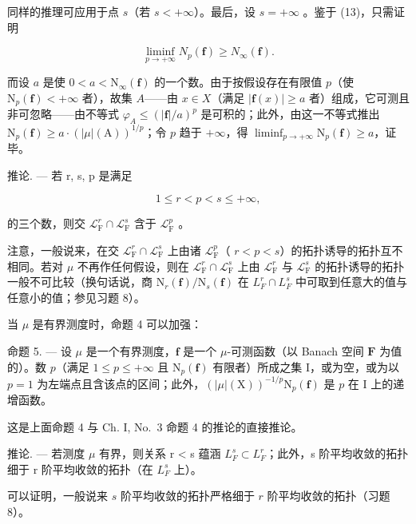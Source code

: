 同样的推理可应用于点 \(s\)（若 \(s < +\infty\)）。最后，设 \(s = +\infty\) 。鉴于 (13)，只需证明

\[
\liminf _ {p \to + \infty} N _ {p} (\mathbf {f}) \geqslant N _ {\infty} (\mathbf {f}).
\]

而设 \(a\) 是使 \(0 < a < \mathrm{N}_{\infty}(\mathbf{f})\) 的一个数。由于按假设存在有限值 \(p\)（使 \(\mathrm{N}_p(\mathbf{f}) < +\infty\) 者），故集 \(A\)——由 \(x \in X\)（满足 \(|\mathbf{f}(x)| \geqslant a\) 者）组成，它可测且非可忽略——由不等式 \(\varphi_A \leqslant (|\mathbf{f}|/a)^p\) 是可积的；此外，由这一不等式推出 \(\mathrm{N}_p(\mathbf{f}) \geqslant a \cdot (|\mu|(\mathrm{A}))^{1/p}\)；令 \(p\) 趋于 \(+\infty\)，得 \(\liminf_{p \to +\infty} \mathrm{N}_p(\mathbf{f}) \geqslant a\)，证毕。

推论. --- 若 r, s, p 是满足

\[
1 \leqslant r <   p <   s \leqslant + \infty ,
\]

的三个数，则交 \(\mathcal{L}_{\mathrm{F}}^{r} \cap \mathcal{L}_{\mathrm{F}}^{s}\) 含于 \(\mathcal{L}_{\mathrm{F}}^{p}\) 。

注意，一般说来，在交 \(\mathcal{L}_{\mathrm{F}}^{r} \cap \mathcal{L}_{\mathrm{F}}^{s}\) 上由诸 \(\mathcal{L}_{\mathrm{F}}^{p}\)（ \(r < p < s\)）的拓扑诱导的拓扑互不相同。若对 \(\mu\) 不再作任何假设，则在 \(\mathcal{L}_{\mathrm{F}}^{r} \cap \mathcal{L}_{\mathrm{F}}^{s}\) 上由 \(\mathcal{L}_{\mathrm{F}}^{r}\) 与 \(\mathcal{L}_{\mathrm{F}}^{s}\) 的拓扑诱导的拓扑一般不可比较（换句话说，商 \(\mathrm{N}_{r}(\mathbf{f})/\mathrm{N}_{s}(\mathbf{f})\) 在 \(L_{F}^{r} \cap L_{F}^{s}\) 中可取到任意大的值与任意小的值；参见习题 8）。

当 \(\mu\) 是有界测度时，命题 4 可以加强：

命题 5. --- 设 \(\mu\) 是一个有界测度，\(\mathbf{f}\) 是一个 \(\mu\)-可测函数（以 Banach 空间 \(\mathbf{F}\) 为值的）。数 \(p\)（满足 \(1 \leqslant p \leqslant +\infty\) 且 \(\mathrm{N}_p(\mathbf{f})\) 有限者）所成之集 I，或为空，或为以 \(p = 1\) 为左端点且含该点的区间；此外，\((|\mu|(\mathrm{X}))^{-1/p} \mathrm{N}_p(\mathbf{f})\) 是 \(p\) 在 I 上的递增函数。

这是上面命题 4 与 Ch. I, No.~3 命题 4 的推论的直接推论。

推论. --- 若测度 \(\mu\) 有界，则关系 r < s 蕴涵 \(L_{F}^{s} \subset L_{F}^{r}\)；此外，s 阶平均收敛的拓扑细于 r 阶平均收敛的拓扑（在 \(L_{F}^{s}\) 上）。

可以证明，一般说来 \(s\) 阶平均收敛的拓扑严格细于 \(r\) 阶平均收敛的拓扑（习题 8）。

